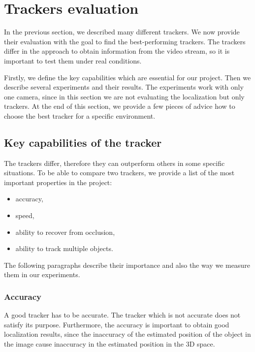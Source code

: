 
\section{Trackers evaluation}

In the previous section, we described many different trackers. We now provide
their evaluation with the goal to find the best-performing trackers. The
trackers differ in the approach to obtain information from the video stream, so
it is important to test them under real conditions.

Firstly, we define the key capabilities which are essential for our project. Then
we describe several experiments and their results. The
experiments work with only one camera, since in this section we are not
evaluating the localization but only trackers. At the end of this section, we
provide a few pieces of advice how to choose the best tracker for a specific
environment.

\subsection*{Key capabilities of the tracker}

The trackers differ, therefore they can outperform others in some specific
situations. To be able to compare two trackers, we provide a list of the most
important properties in the project:

\begin{itemize}
	\item accuracy,
	\item speed,
	\item ability to recover from occlusion,
	\item ability to track multiple objects.
\end{itemize}

The following paragraphs describe their importance and also the way we measure them
in our experiments.

\subsubsection*{Accuracy}

A good tracker has to be accurate. The tracker which is not accurate does not
satisfy its purpose. Furthermore, the accuracy is important to obtain good
localization results, since the inaccuracy of the estimated position of the
object in the image cause inaccuracy in the estimated position in the 3D space.

